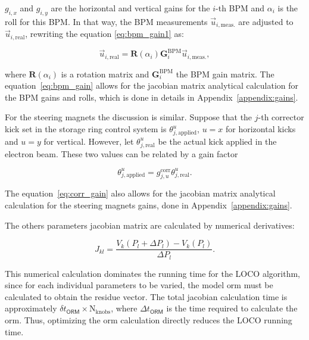 $g_{i, x}$ and $g_{i, y}$ are the horizontal and vertical gains for the $i$-th BPM and $\alpha_i$ is the roll for this BPM. In that way, the BPM measurements $\vec{u}_{i, \mathrm{meas.}}$ are adjusted to $\vec{u}_{i, \mathrm{real}}$, rewriting the equation \eqref{eq:bpm_gain1} as:

\begin{equation}
    \vec{u}_{i, \mathrm{real}} = \mathbf{R}\left(\alpha_i\right) \mathbf{G}_{i}^{\mathrm{BPM}} \vec{u}_{i, \mathrm{meas.}},
    \label{eq:bpm_gain}
\end{equation}

where $\mathbf{R}\left(\alpha_i\right)$ is a rotation matrix and $\mathbf{G}_{i}^{\mathrm{BPM}}$ the BPM gain matrix. The equation~\eqref{eq:bpm_gain} allows for the jacobian matrix analytical calculation for the BPM gains and rolls, which is done in details in Appendix~\ref{appendix:gains}.

For the steering magnets the discussion is similar. Suppose that the $j$-th corrector kick set in the storage ring control system is $\theta_{j, \mathrm{applied}}^u$, $u=x$ for horizontal kicks and $u=y$ for vertical. However, let $\theta_{j, \mathrm{real}}^u$ be the actual kick applied in the electron beam. These two values can be related by a gain factor

\begin{equation}
    \theta_{j, \mathrm{applied}}^u = g_{j, u}^{\mathrm{corr}}\theta_{j, \mathrm{real}}^u.
    \label{eq:corr_gain}
\end{equation}

The equation~\eqref{eq:corr_gain} also allows for the jacobian matrix analytical calculation for the steering magnets gains, done in Appendix~\ref{appendix:gains}.

The others parameters jacobian matrix are calculated by numerical derivatives:

\begin{equation}
    J_{kl} = \dfrac{V_{k}\left(P_{l} + \Delta P_{l}\right) - V_{k}\left(P_{l}\right)}{\Delta P_{l}}.
\end{equation}

This numerical calculation dominates the running time for the LOCO algorithm, since for each individual parameters to be varied, the model \gls{orm} must be calculated to obtain the residue vector. The total jacobian calculation time is approximately $\delta t_{\mathsf{ORM}} \times \mathrm{N}_{\mathrm{knobs}}$, where $\Delta t_{\mathsf{ORM}}$ is the time required to calculate the \gls{orm}. Thus, optimizing the \gls{orm} calculation directly reduces the LOCO running time.

